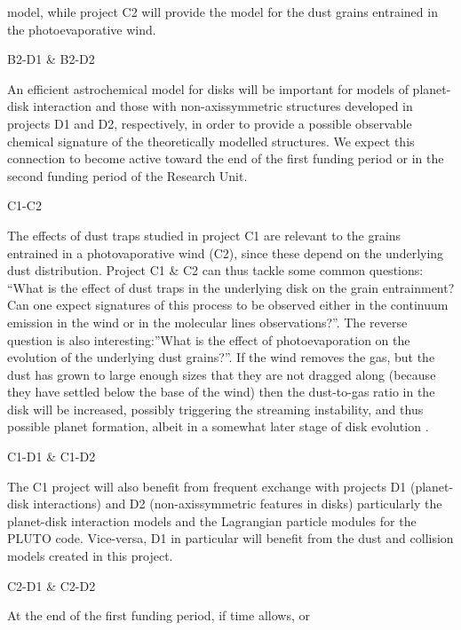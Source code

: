 \documentclass[10pt,fleqn,twoside]{article}
\begin{document}
model, while project C2 will provide the model for the dust
grains entrained in the photoevaporative wind. \\
\begin{Emphasize} B2-D1 \& B2-D2  \end{Emphasize}
An efficient astrochemical model for disks will be important for models of planet-disk
interaction and those with non-axissymmetric structures developed in
projects D1 and D2, respectively, in order to provide a possible
observable chemical signature of the theoretically modelled
structures. We expect this connection to become active toward the end
of the first funding period or in the second funding period of the
Research Unit. \\
\begin{Emphasize}  C1-C2  \end{Emphasize} The effects of dust traps studied in
project C1 are relevant to the grains entrained in a photovaporative
wind (C2), since these depend on the underlying dust
distribution. Project C1 \& C2 can thus tackle some common questions: ``What is the effect of dust traps in the underlying disk
on the grain entrainment? Can one expect signatures of this process to
be observed either in the continuum emission in the wind or in the
molecular lines observations?''. The reverse question is also
interesting:''What is the effect of photoevaporation on the evolution
of the underlying dust grains?''.  If the wind removes the gas, but the dust has
  grown to large enough sizes that they are not dragged along (because they
  have settled below the base of the wind) then the dust-to-gas ratio in the
  disk will be increased, possibly triggering the streaming instability, and
  thus possible planet formation, albeit in a somewhat later stage of disk
  evolution \citep[e.g.][]{2005ApJ...623L.149T}.\\
\begin{Emphasize}  C1-D1 \& C1-D2  \end{Emphasize}
  The C1 project will also benefit from 
frequent exchange with projects D1 (planet-disk interactions) and D2
(non-axissymmetric features in disks)
particularly the planet-disk interaction models and the Lagrangian
particle modules for the PLUTO code. Vice-versa, D1 in particular will
benefit from the dust and collision models created in this
project. \\
\begin{Emphasize}  C2-D1 \& C2-D2 \end{Emphasize} At the end of the first funding period, if time allows, or
\end{document}

